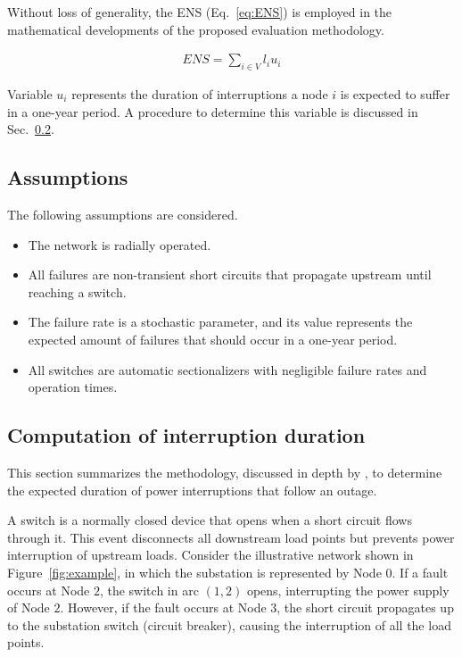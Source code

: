 Without loss of generality, the ENS (Eq.~\ref{eq:ENS}) is employed in the mathematical developments of the proposed evaluation methodology.

\begin{align} 
ENS = \sum_{i \in V}{\displaystyle l_iu_i} \label{eq:ENS}
\end{align}


Variable $u_i$ represents the duration of interruptions a node $i$ is expected to suffer in a one-year period. A procedure to determine this variable is discussed in Sec.~\ref{sec:Interruption}.



\subsection{Assumptions}

The following assumptions are considered.

\begin{itemize}
	\item The network is radially operated.
	\item All failures are non-transient short circuits that propagate upstream until reaching a switch.
	\item The failure rate is a stochastic parameter, and its value represents the expected amount of failures that should occur in a one-year period.
	\item All switches are automatic sectionalizers with negligible failure rates and operation times. 
\end{itemize}



\subsection{Computation of interruption duration}  \label{sec:Interruption}

This section summarizes the methodology, discussed in depth by \cite{billinton}, to determine the expected duration of power interruptions that follow an outage. 

A switch is a  normally closed device that opens when a short circuit flows through it. This event disconnects all downstream load points but prevents power interruption of  upstream loads. Consider the illustrative network shown in Figure~\ref{fig:example}, in which the substation is represented by Node $0$. If a fault occurs at Node $2$, the switch in arc $(1,2)$ opens, interrupting the power supply of Node $2$. However, if the fault occurs at Node $3$, the short circuit propagates up to the substation switch (circuit breaker), causing the interruption of all the load points.


